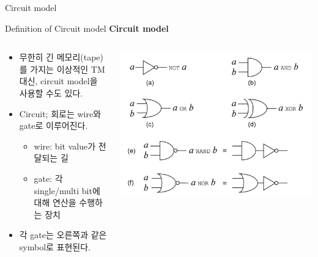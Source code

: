 \documentclass[9pt]{beamer}
\begin{document}
    \begin{section}{Circuit model}
        \begin{frame}{Definition of Circuit model}
            \textbf{Circuit model}
            \begin{columns}
                \begin{column}{0.6\textwidth}
                    \begin{itemize}
                        \item 무한히 긴 메모리(tape)를 가지는 이상적인 TM 대신, circuit model을 사용할 수도 있다.
                        \item Circuit; 회로는 wire와 gate로 이루어진다.
                        \begin{itemize}
                            \item wire: bit value가 전달되는 길
                            \item gate: 각 single/multi bit에 대해 연산을 수행하는 장치
                        \end{itemize}
                        \item 각 gate는 오른쪽과 같은 symbol로 표현된다.
                    \end{itemize}
                \end{column}
                \begin{column}{0.45\textwidth}  %
                    \begin{center}
                        \includegraphics[width=0.95\columnwidth]{image/L3_gate_symbol.png}
                    \end{center}
                \end{column}
                \end{columns}
        \end{frame}


\end{section}
\end{document}
